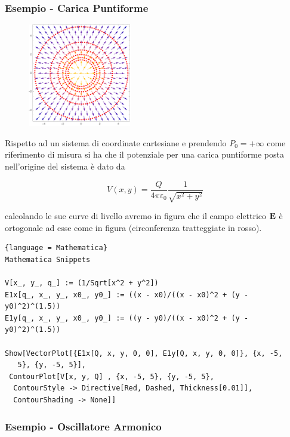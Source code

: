 \subsubsection{Esempio - Carica Puntiforme}

\begin{figure}
  \begin{center}
    \includegraphics[width=0.4\textwidth]{images/contour}
  \end{center}
\end{figure}
Rispetto ad un sistema di coordinate cartesiane e prendendo $P_0 = + \infty$ come riferimento di misura si ha che il potenziale per una carica puntiforme posta nell'origine del sistema \`e dato da


\begin{equation*}
	V(x,y) = \frac{Q}{4 \pi \varepsilon_0} \frac{1}{\sqrt{x^2+y^2}}
\end{equation*}
 

\vspace{0.4cm}
\noindent calcolando le sue curve di livello avremo in figura che il campo elettrico $\bold{E}$ \`e ortogonale ad esse come in figura (circonferenza tratteggiate in rosso).
\newpage

\begin{lstlisting}{language = Mathematica}
Mathematica Snippets

V[x_, y_, q_] := (1/Sqrt[x^2 + y^2])
E1x[q_, x_, y_, x0_, y0_] := ((x - x0)/((x - x0)^2 + (y - y0)^2)^(1.5))
E1y[q_, x_, y_, x0_, y0_] := ((y - y0)/((x - x0)^2 + (y - y0)^2)^(1.5))

Show[VectorPlot[{E1x[Q, x, y, 0, 0], E1y[Q, x, y, 0, 0]}, {x, -5, 
   5}, {y, -5, 5}],
 ContourPlot[V[x, y, Q] , {x, -5, 5}, {y, -5, 5}, 
  ContourStyle -> Directive[Red, Dashed, Thickness[0.01]], 
  ContourShading -> None]]
\end{lstlisting}

\subsubsection{Esempio - Oscillatore Armonico}

